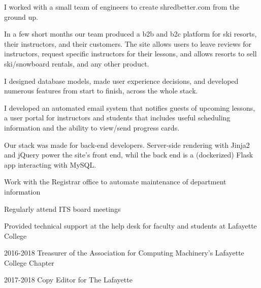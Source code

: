 \documentclass[letterpaper]{deedy-resume} %
\begin{document}
\begin{minipage}[t]{0.64\textwidth}
I worked with a small team of engineers to create shredbetter.com from the ground up.
\begin{tightitemize}
\item In a few short months our team produced a b2b and b2c platform for ski resorts, their instructors, and their customers. The site allows users to leave reviews for instructors, request specific instructors for their lessons, and allows resorts to sell ski/snowboard rentals, and any other product.
\item I designed database models, made user experience decisions, and developed numerous features from start to finish, across the whole stack. 
\item I developed an automated email system that notifies guests of upcoming lessons, a user portal for instructors and students that includes useful scheduling information and the ability to view/send progress cards.
\item Our stack was made for back-end developers. Server-side rendering with Jinja2 and jQuery power the site's front end, whil the back end is a (dockerized) Flask app interacting with MySQL.
\end{tightitemize}
\sectionspace
{}

\begin{tightitemize}
\item Work with the Registrar office to automate maintenance of department information
\item Regularly attend ITS board meetings
\item Provided technical support at the help desk for faculty and students at Lafayette College
\end{tightitemize}
\sectionspace %



\sectionspace %



\begin{tightitemize}
\item 2016-2018 Treasurer of the Association for Computing Machinery's 
Lafayette College Chapter \\
\item 2017-2018 Copy Editor for The Lafayette 
\end{tightitemize}

\sectionspace
\end{minipage} %
\end{document}
